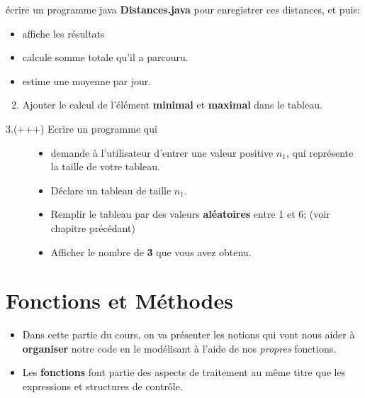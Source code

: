 \documentclass[letterpaper,10pt,english]{sphinxmanual}
\begin{document}
écrire un programme java \textbf{Distances.java} pour enregistrer ces distances, et puis:
\begin{itemize}
\item {} 
affiche les résultats

\item {} 
calcule somme totale qu'il a parcouru.

\item {} 
estime une moyenne par jour.

\end{itemize}
\begin{enumerate}
\setcounter{enumi}{1}
\item {} 
Ajouter le calcul de l'élément \textbf{minimal} et \textbf{maximal} dans le tableau.

\end{enumerate}
\begin{description}
\item[{3.(+++) Ecrire un programme qui}] \leavevmode\begin{itemize}
\item {} 
demande à l'utilisateur d'entrer une valeur positive \(n_1\), qui représente la taille de votre tableau.

\item {} 
Déclare un tableau de taille \(n_1\).

\item {} 
Remplir le tableau par des valeurs \textbf{aléatoires} entre 1 et 6; (voir chapitre précédant)

\item {} 
Afficher le nombre de \textbf{3} que vous avez obtenu.

\end{itemize}

\end{description}


\section{Fonctions et Méthodes}
\label{fonctions:fonctions-et-methodes}\label{fonctions::doc}\begin{itemize}
\item {} 
Dans cette partie du cours, on va présenter les notions qui vont nous aider à \textbf{organiser} notre code en le modélisant à l'aide de nos \emph{propres} fonctions.

\item {} 
Les \textbf{fonctions} font partie des aspects de traitement au même titre que les expressions et structures de contrôle.

\end{itemize}
\end{document}
